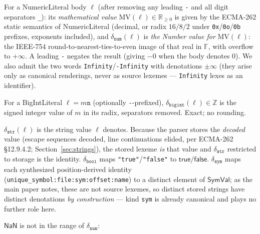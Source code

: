 \documentclass[11pt]{article}
\newcommand{\SymVal}{\mathsf{SymVal}}
\newcommand{\Fdb}{\mathbb{F}}
\begin{document}
\begin{definition}
\label{def:deltanum}
For a NumericLiteral body $\ell$ (after removing any leading \texttt{-}
and all digit separators \texttt{\_}): its \emph{mathematical value}
$\mathrm{MV}(\ell) \in \mathbb{R}_{\geq 0}$ is given by the ECMA-262
static semantics of NumericLiteral (decimal, or radix $16/8/2$ under
\texttt{0x}/\texttt{0o}/\texttt{0b} prefixes, exponents included), and
$\delta_{\texttt{num}}(\ell)$ is \emph{the Number value for}
$\mathrm{MV}(\ell)$: the IEEE-754 round-to-nearest-ties-to-even image of
that real in $\Fdb$, with overflow to $+\infty$. A leading \texttt{-}
negates the result (giving $-0$ when the body denotes $0$). We also admit
the two words \texttt{Infinity}/\texttt{-Infinity} with denotations
$\pm\infty$ (they arise only as canonical renderings, never as source
lexemes --- \texttt{Infinity} lexes as an identifier).
\end{definition}

\begin{definition}
For a BigIntLiteral $\ell = m\texttt{n}$ (optionally \texttt{-}-prefixed),
$\delta_{\texttt{bigint}}(\ell) \in \mathbb{Z}$ is the signed integer
value of $m$ in its radix, separators removed. Exact; no rounding.
\end{definition}

\begin{definition}
\label{def:deltarest}
$\delta_{\texttt{str}}(\ell)$ is the string value $\ell$ denotes.
Because the parser stores the \emph{decoded} value (escape sequences
decoded, line continuations elided, per ECMA-262 \S12.9.4.2;
Section~\ref{sec:strings}), the stored lexeme \emph{is} that value and
$\delta_{\texttt{str}}$ restricted to storage is the identity.
$\delta_{\texttt{bool}}$ maps \texttt{"true"}/\texttt{"false"} to
$\mathsf{true}/\mathsf{false}$. $\delta_{\texttt{sym}}$ maps each
synthesized position-derived identity
(\texttt{unique\_symbol:file:sym:offset:name}) to a distinct element of
$\SymVal$; as the main paper notes, these are not source lexemes, so
distinct stored strings have distinct denotations \emph{by construction}
--- kind \texttt{sym} is already canonical and plays no further role
here.
\end{definition}

$\mathsf{NaN}$ is not in the range of $\delta_{\texttt{num}}$:
\end{document}
